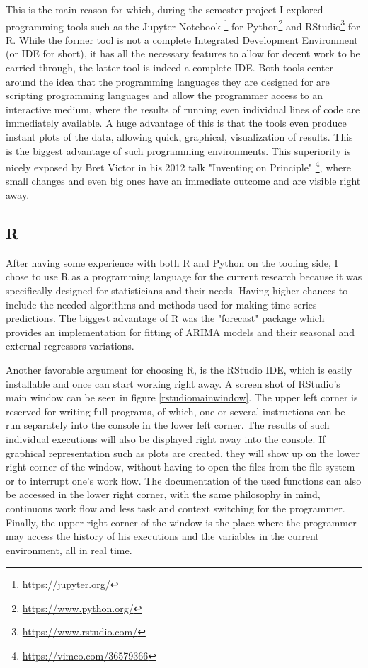 \documentclass[12pt,a4paper,titlepage]{report}
\begin{document}
This is the main reason for which, during the semester project I explored programming tools such as the Jupyter Notebook \footnote{\url{https://jupyter.org/}} for Python\footnote{\url{https://www.python.org/}} and RStudio\footnote{\url{https://www.rstudio.com/}} for R. While the former tool is not a complete Integrated Development Environment (or IDE for short), it has all the necessary features to allow for decent work to be carried through, the latter tool is indeed a complete IDE. Both tools center around the idea that the programming languages they are designed for are scripting programming languages and allow the programmer access to an interactive medium, where the results of running even individual lines of code are immediately available. A huge advantage of this is that the tools even produce instant plots of the data, allowing quick, graphical, visualization of results. This is the biggest advantage of such programming environments. This superiority is nicely exposed by Bret Victor in his 2012 talk "Inventing on Principle" \footnote{\url{https://vimeo.com/36579366}}, where small changes and even big ones have an immediate outcome and are visible right away.

\subsection{R} \label{rtheorysection}

After having some experience with both R and Python on the tooling side, I chose to use R as a programming language for the current research because it was specifically designed for statisticians and their needs. Having higher chances to include the needed algorithms and methods used for making time-series predictions. The biggest advantage of R was the "forecast" package \cite{rforecastpackage} \cite{automatictimeseriesforecasting} which provides an implementation for fitting of ARIMA models and their seasonal and external regressors variations.

Another favorable argument for choosing R, is the RStudio IDE, which is easily installable and once can start working right away.
A screen shot of RStudio's main window can be seen in figure \ref{rstudiomainwindow}. The upper left corner is reserved for writing full programs, of which, one or several instructions can be run separately into the console in the lower left corner. The results of such individual executions will also be displayed right away into the console. If graphical representation such as plots are created, they will show up on the lower right corner of the window, without having to open the files from the file system or to interrupt one's work flow. The documentation of the used functions can also be accessed in the lower right corner, with the same philosophy in mind, continuous work flow and less task and context switching for the programmer. Finally, the upper right corner of the window is the place where the programmer may access the history of his executions and the variables in the current environment, all in real time.
\end{document}
